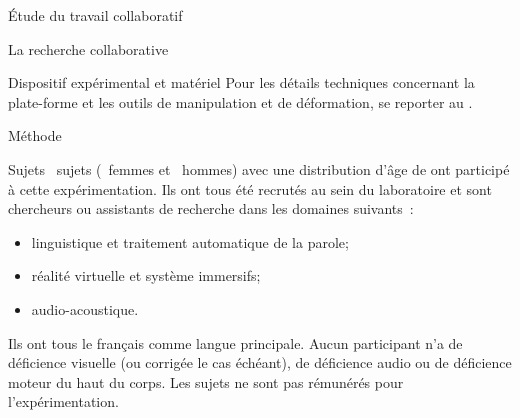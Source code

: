 \documentclass[myfrancais]{mythesis}
\begin{document}
\begin{mypart}{Étude du travail collaboratif}
\begin{mychapter}{La recherche collaborative}
\begin{mysection}{Dispositif expérimental et matériel}
				Pour les détails techniques concernant la plate-forme et les outils de manipulation et de déformation, se reporter au .
			\end{mysection}
			\begin{mysection}{Méthode}
				\begin{mysubsection}[sse-exp1-Sujets]{Sujets}
					~sujets (~femmes et ~hommes) avec une distribution d'âge de  ont participé à cette expérimentation.
					Ils ont tous été recrutés au sein du laboratoire  et sont chercheurs ou assistants de recherche dans les domaines suivants~:
					\begin{itemize}
						\item linguistique et traitement automatique de la parole;
						\item réalité virtuelle et système immersifs;
						\item audio-acoustique.
					\end{itemize}
					Ils ont tous le français comme langue principale.
					Aucun participant n'a de déficience visuelle (ou corrigée le cas échéant), de déficience audio ou de déficience moteur du haut du corps.
					Les sujets ne sont pas rémunérés pour l'expérimentation.


\end{mysubsection}
\end{mysection}
\end{mychapter}
\end{mypart}
\end{document}
